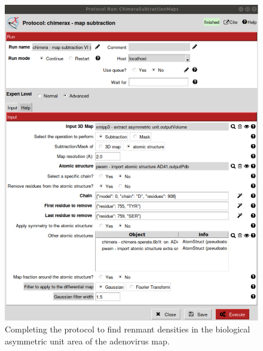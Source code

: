 \begin{itemize}
                            \begin{figure}[H]
                            \centering 
                            \captionsetup{width=.9\linewidth} 
                            \includegraphics[width=.50\textwidth]{Images_appendix/Fig313.pdf}
                            \caption{Completing the protocol  to find renmant densities in the biological asymmetric unit area of the adenovirus map.}  
                            \label{fig:app_usecase_mapsubtract_5}
                            \end{figure}
                            

\end{itemize}
